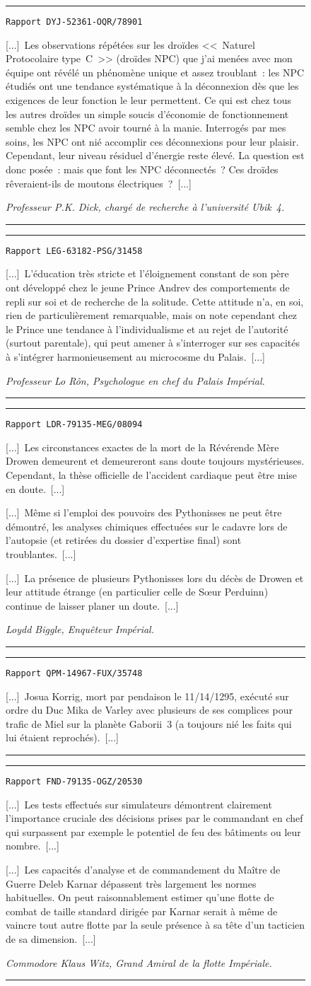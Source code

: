 \documentclass{article}
\newcommand{\indice}[3]{
    \begin{figure}[H]
        \begin{center}
            \rule{0.5\textwidth}{1pt}
        \end{center}
        \begin{framed}
            \begin{samepage}
                \texttt{Rapport #1}
                \nopagebreak

                [...]~#2~[...]

                \nopagebreak
                \hfill\textit{#3}
            \end{samepage}
        \end{framed}
        \caption{}
        \begin{center}
            \rule{0.5\textwidth}{1pt}
        \end{center}
    \end{figure}
}
\begin{document}
\indice
{DYJ-52361-OQR/78901}
{Les observations répétées sur les droïdes <<~Naturel Protocolaire
type~C~>> (droïdes NPC) que j'ai menées avec mon équipe ont révélé un
phénomène unique et assez troublant~: les NPC étudiés ont une tendance
systématique à la déconnexion dès que les exigences de leur fonction le
leur permettent. Ce qui est chez tous les autres droïdes un simple soucis
d'économie de fonctionnement semble chez les NPC avoir tourné à la manie.
Interrogés par mes soins, les NPC ont nié accomplir ces déconnexions pour
leur plaisir. Cependant, leur niveau résiduel d'énergie reste élevé. La
question est donc posée~: mais que font les NPC déconnectés~? Ces droïdes
rêveraient-ils de moutons électriques~?} 
{Professeur P.K. Dick, chargé de recherche à l'université Ubik~4.}

\indice
{LEG-63182-PSG/31458}
{L'éducation très stricte et l'éloignement constant de son père ont
développé chez le jeune Prince Andrev des comportements de repli sur soi et
de recherche de la solitude. Cette attitude n'a, en soi, rien de
particulièrement remarquable, mais on note cependant chez le Prince une
tendance à l'individualisme et au rejet de l'autorité (surtout parentale),
qui peut amener à s'interroger sur ses capacités à s'intégrer
harmonieusement au microcosme du Palais.}
{Professeur Lo Rôn, Psychologue en chef du Palais Impérial.}

\indice
{LDR-79135-MEG/08094}
{Les circonstances exactes de la mort de la Révérende Mère Drowen
demeurent et demeureront sans doute toujours mystérieuses. Cependant, la
thèse officielle de l'accident cardiaque peut être mise en doute.~[...]

\nobreak

[...]~Même si l'emploi des pouvoirs des Pythonisses ne peut être démontré,
les analyses chimiques effectuées sur le cadavre lors de l'autopsie (et
retirées du dossier d'expertise final) sont troublantes.~[...]

\nobreak

[...]~La présence de plusieurs Pythonisses lors du décès de Drowen et leur
attitude étrange (en particulier celle de S\oe{}ur Perduinn) continue de
laisser planer un doute.}
{Loydd Biggle, Enquêteur Impérial.}

\indice
{QPM-14967-FUX/35748}
{Josua Korrig, mort par pendaison le 11/14/1295, exécuté sur ordre du Duc
Mika de Varley avec plusieurs de ses complices pour trafic de Miel sur la
planète Gaborii~3 (a toujours nié les faits qui lui étaient reprochés).}
{}

\indice
{FND-79135-OGZ/20530}
{Les tests effectués sur simulateurs démontrent clairement l'importance
cruciale des décisions prises par le commandant en chef qui surpassent par
exemple le potentiel de feu des bâtiments ou leur nombre.~[...]

\nobreak

[...]~Les capacités d'analyse et de commandement du Maître de Guerre Deleb
Karnar dépassent très largement les normes habituelles. On peut
raisonnablement estimer qu'une flotte de combat de taille standard dirigée par
Karnar serait à même de vaincre tout autre flotte par la seule présence à sa
tête d'un tacticien de sa dimension.}
{Commodore Klaus Witz, Grand Amiral de la flotte Impériale.}
\end{document}
